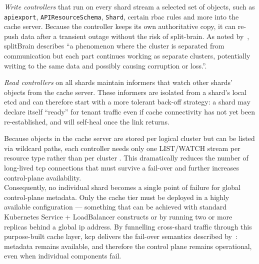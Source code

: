 \documentclass[11pt, a4paper, oneside, listof=totoc]{scrartcl}
\begin{document}
                \begin{enumerate}[label={[\arabic*]:},
                    ref=Challenge~\arabic*,
                    leftmargin=*,
                    itemsep=0.6\baselineskip]

                    \item\label{chal:writeControllers}
                        \textit{Write controllers}
                        that run on every shard stream a selected set of objects, such as
                        \texttt{\gls{apiexport}}, \texttt{APIResourceSchema}, \texttt{Shard}, certain
                        \gls{rbac} rules and more into the cache server.
                        Because the controller keeps its own authoritative copy, it can re-push data
                        after a transient outage without the risk of split-brain.
                        As noted by~\cite{redhatHA2021}, \gls{splitBrain} describes \enquote{a
                        phenomenon where the cluster is separated from communication but each part
                        continues working as separate clusters, potentially writing to the same data
                        and possibly causing corruption or loss.}.

                    \item\label{chal:readControllers}
                        \textit{Read controllers}
                        on all shards maintain informers that watch other shards' objects from the
                        cache server.
                        These informers are isolated from a shard's local \gls{etcd} and can
                        therefore start with a more tolerant back-off strategy: a shard may declare
                        itself \enquote{ready} for tenant traffic even if cache connectivity has not
                        yet been re-established, and will self-heal once the link returns.
                \end{enumerate}

                Because objects in the cache server are stored per logical cluster but can be listed
                via wildcard paths, each controller needs only one LIST/WATCH stream per resource
                type rather than per cluster \parencite{kcpShardingCacheServer}.
                This dramatically reduces the number of long-lived \gls{tcp} connections that must
                survive a fail-over and further increases control-plane availability.
                \\
                Consequently, no individual shard becomes a single point of failure for global
                control-plane metadata.
                Only the cache tier must be deployed in a highly available configuration ---
                something that can be achieved with standard Kubernetes Service + LoadBalancer
                constructs or by running two or more replicas behind a global \gls{ip} address.
                By funnelling cross-shard traffic through this purpose-built cache layer, \gls{kcp}
                delivers the fail-over semantics described by~\cite{nist800-113}: metadata remains
                available, and therefore the control plane remains operational, even when individual
                components fail.
\end{document}
